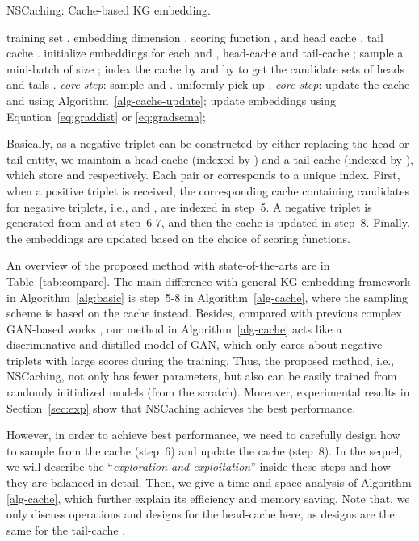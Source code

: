 \documentclass[conference]{IEEEtran}
\begin{document}
\begin{algorithm}[ht]
	\caption{NSCaching: Cache-based KG embedding.}
	\label{alg-cache}
	\begin{algorithmic}[1]
		\REQUIRE training set , embedding dimension , scoring function , and head cache , tail cache .
		\STATE initialize embeddings for each  and ,
		head-cache  and tail-cache ;
\FOR{}
		\STATE sample a mini-batch  of size ;
		\STATE index the cache  by  and  by  to get the candidate sets of heads  and tails .
		\STATE \textit{core step}: sample  and .
		\STATE uniformly pick up .
\STATE \textit{core step}: update the cache  and  using Algorithm~\ref{alg-cache-update};
		\STATE update embeddings 
		using Equation~\eqref{eq:graddist} or \eqref{eq:gradsema};
		\ENDFOR
		
		\ENDFOR
	\end{algorithmic}
\end{algorithm}

Basically,
as a negative triplet can be constructed by
either replacing the head or tail entity,
we maintain a head-cache  (indexed by ) and a tail-cache  (indexed by ),
which store  and  respectively. 
Each pair  or  corresponds to a unique index.
First,
when a positive triplet is received,
the corresponding cache containing candidates for negative triplets, 
i.e., 
 and ,
are indexed in step~5.
A negative triplet is generated from  and  at step~6-7,
and then the cache is updated in step~8.
Finally,
the embeddings are updated based on the choice of scoring functions.

An overview of the proposed method
with state-of-the-arts are in Table~\ref{tab:compare}.
The main difference with general KG embedding framework in Algorithm~\ref{alg:basic} is step~5-8 in Algorithm~\ref{alg-cache},
where the sampling scheme is based on the cache instead.
Besides,
compared with 
previous complex GAN-based works \cite{wang2018incorporating,cai2018kbgan},
our method in Algorithm~\ref{alg-cache} acts like a discriminative and distilled model of GAN,
which only cares about negative triplets with large scores during the training.
Thus,
the proposed method,
i.e.,
NSCaching,
not only has fewer parameters,
but also can be easily trained from randomly initialized models (from the scratch).
Moreover,
experimental results in Section~\ref{sec:exp} show that NSCaching achieves the best performance.


However,
in order to achieve best performance,
we need to carefully design how to sample from the cache (step~6) and update the cache (step~8).
In the sequel,
we will describe the ``\textit{exploration and exploitation}'' inside these steps 
and how they are balanced in detail.
Then,
we give a time and space analysis of Algorithm \ref{alg-cache},
which further explain its efficiency and memory saving.
Note that,
we only discuss operations and designs for the head-cache  here,
as designs are the same for the tail-cache .
\end{document}
